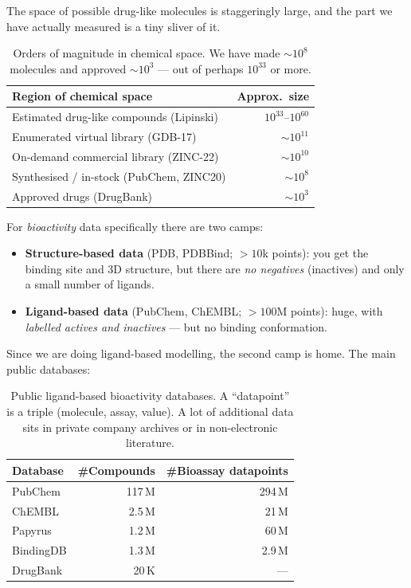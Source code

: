 \documentclass[11pt, oneside]{book}
\begin{document}
The space of possible drug-like molecules is staggeringly large, and the part we
have actually measured is a tiny sliver of it.

\begin{table}[H]
\centering
\small
\begin{tabular}{lr}
\toprule
\textbf{Region of chemical space} & \textbf{Approx.\ size} \\
\midrule
Estimated drug-like compounds (Lipinski) & $10^{33}$--$10^{60}$ \\
Enumerated virtual library (GDB-17)       & $\sim 10^{11}$ \\
On-demand commercial library (ZINC-22)    & $\sim 10^{10}$ \\
Synthesised / in-stock (PubChem, ZINC20)  & $\sim 10^{8}$ \\
Approved drugs (DrugBank)                  & $\sim 10^{3}$ \\
\bottomrule
\end{tabular}
\caption{Orders of magnitude in chemical space. We have made $\sim 10^{8}$
molecules and approved $\sim 10^{3}$ --- out of perhaps $10^{33}$ or more.}
\end{table}

For \emph{bioactivity} data specifically there are two camps:

\begin{itemize}
  \item \textbf{Structure-based data} (PDB, PDBBind; $> 10$k points): you get the
        binding site and 3D structure, but there are \emph{no negatives}
        (inactives) and only a small number of ligands.
  \item \textbf{Ligand-based data} (PubChem, ChEMBL; $> 100$M points): huge, with
        \emph{labelled actives and inactives} --- but no binding conformation.
\end{itemize}

Since we are doing ligand-based modelling, the second camp is home. The main
public databases:

\begin{table}[H]
\centering
\small
\begin{tabular}{lrr}
\toprule
\textbf{Database} & \textbf{\#Compounds} & \textbf{\#Bioassay datapoints} \\
\midrule
PubChem   & 117\,M & 294\,M \\
ChEMBL    & 2.5\,M & 21\,M \\
Papyrus   & 1.2\,M & 60\,M \\
BindingDB & 1.3\,M & 2.9\,M \\
DrugBank  & 20\,K  & --- \\
\bottomrule
\end{tabular}
\caption{Public ligand-based bioactivity databases. A ``datapoint'' is a triple
(molecule, assay, value). A lot of additional data sits in private company
archives or in non-electronic literature.}
\end{table}
\end{document}
